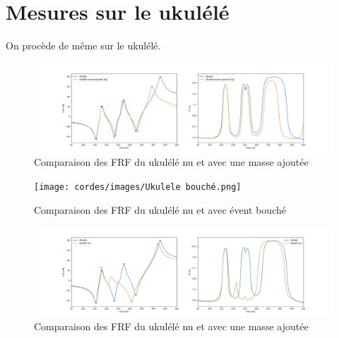 \documentclass[atiam, article]{rapport} %
\begin{document}
\section{Mesures sur le ukulélé}
On procède de même sur le ukulélé.

\begin{figure}
    \centering
    \includegraphics[width=\textwidth]{cordes/images/Ukulele masse ajoutee 20g.png}
    \caption{Comparaison des FRF du ukulélé nu et avec une masse ajoutée}
    \label{fig:enter-label}
\end{figure}

\begin{figure}
    \centering
    \texttt{[image: cordes/images/Ukulele bouché.png]}
    \caption{Comparaison des FRF du ukulélé nu et avec évent bouché}
    \label{fig:enter-label}
\end{figure}

\begin{figure}
    \centering
    \includegraphics[width=\textwidth]{cordes/images/Ukulele col.png}
    \caption{Comparaison des FRF du ukulélé nu et avec une masse ajoutée}
    \label{fig:enter-label}
\end{figure}

\printbibliography
\end{document}
